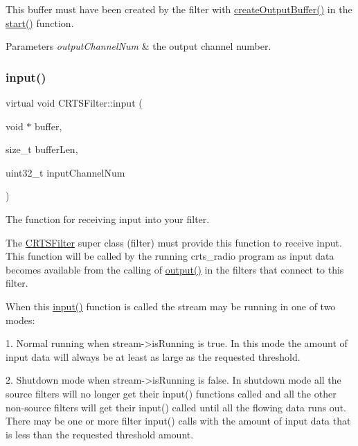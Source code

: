 This buffer must have been created by the filter with \hyperlink{classCRTSFilter_a7a10a3daf1d7ee26e8b414c16901b315}{create\+Output\+Buffer()} in the \hyperlink{classCRTSFilter_a15a3e99b38a67fd40559776d468b95fa}{start()} function.


\begin{DoxyParams}{Parameters}
{\em output\+Channel\+Num} & the output channel number. \\
\hline
\end{DoxyParams}
\mbox{\label{classCRTSFilter_ab75eb3db5914c0d6b3781439d46b2301}} 
\subsubsection{\texorpdfstring{input()}{input()}}
{\footnotesize\ttfamily virtual void C\+R\+T\+S\+Filter\+::input (\begin{DoxyParamCaption}\item[{void $\ast$}]{buffer,  }\item[{size\+\_\+t}]{buffer\+Len,  }\item[{uint32\+\_\+t}]{input\+Channel\+Num }\end{DoxyParamCaption})\hspace{0.3cm}{\ttfamily [pure virtual]}}

The function for receiving input into your filter.

The \hyperlink{classCRTSFilter}{C\+R\+T\+S\+Filter} super class (filter) must provide this function to receive input. This function will be called by the running crts\+\_\+radio program as input data becomes available from the calling of \hyperlink{classCRTSFilter_afe899250f3aa73aa8eb5aed7dfc371de}{output()} in the filters that connect to this filter.

When this \hyperlink{classCRTSFilter_ab75eb3db5914c0d6b3781439d46b2301}{input()} function is called the stream may be running in one of two modes\+: \begin{DoxyVerb} 1. Normal running when stream->isRunning is true.  In this
 mode the amount of input data will always be at least as
 large as the requested threshold.

 2. Shutdown mode when stream->isRunning is false.  In
 shutdown mode all the source filters will no longer get
 their input() functions called and all the other
 non-source filters will get their input() called until all
 the flowing data runs out.  There may be one or more
 filter input() calls with the amount of input data that is
 less than the requested threshold amount.
\end{DoxyVerb}



